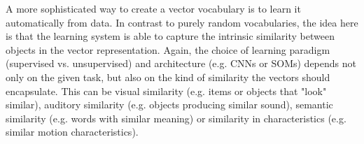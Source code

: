 A more sophisticated way to create a vector vocabulary is to learn it automatically from data.
In contrast to purely random vocabularies, the idea here is that the learning system is able to capture the intrinsic similarity between objects in the vector representation.
Again, the choice of learning paradigm (supervised vs. unsupervised) and architecture (e.g. \acp{CNN} or \acp{SOM}) depends not only on the given task, but also on the kind of similarity the vectors should encapsulate.
This can be visual similarity (e.g. items or objects that "look" similar), auditory similarity (e.g. objects producing similar sound), semantic similarity (e.g. words with similar meaning) or similarity in characteristics (e.g. similar motion characteristics).

